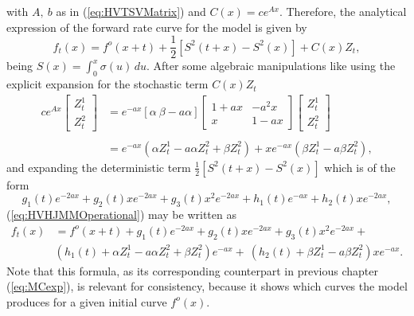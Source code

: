 with $A,~b$ as in (\ref{eq:HVTSVMatrix}) and $C(x)=c e^{A x}$. %
Therefore, the analytical expression of the forward rate curve for the model is
given by \begin{equation}
\label{eq:HVHJMMOperational}
f_t(x)=f^o(x+t)+\frac{1}{2}\left[S^2(t+x)-S^2(x)\right]+C(x)Z_t,
\end{equation}
being $S(x)=\int_0^x \sigma(u)\, du$. After some algebraic
manipulations like using the explicit expansion for the stochastic term 
$C(x) Z_t$  
\begin{equation}
\begin{split}
c e^{A x}\left[\begin{array}{c}
Z^1_t\\
Z^2_t
\end{array}\right] & = e^{-a x}\left[\alpha~\beta-a\alpha\right]
\left[\begin{array}{rr}
1+a x & -a^2 x \\
x & 1-a x
\end{array}\right]\left[\begin{array}{c}
Z^1_t\\
Z^2_t
\end{array}\right] \\ \nonumber
& \\
& = e^{-a x} \left(\alpha  Z^1_t-a \alpha 
   Z^2_t+\beta  Z^2_t\right)+x e^{-a x}
   \left(\beta  Z^1_t-a \beta 
   Z^2_t\right),
\end{split}
\end{equation}
and expanding the deterministic term
$\frac{1}{2}\left[S^2(t+x)-S^2(x)\right]$ which is of the form 
$$
g_1(t) e^{-2 a x}+g_2(t)x e^{-2 a x}+g_3(t) x^2 e^{-2 a x}+h_1(t) e^{-a x}+h_2(t) x e^{- 2 a x},
$$  
(\ref{eq:HVHJMMOperational}) may be written as
\begin{equation}
\label{eq:HVMCexp}
\begin{split}
f_t(x) & =f^o(x+t)+ g_1(t) e^{-2 a x}+g_2(t)x e^{-2 a x}+g_3(t) x^2 e^{-2 a x}+  \\ 
&  \left(h_1(t)+\alpha  Z^1_t-a \alpha Z^2_t+\beta Z^2_t\right)e^{-a x}
+ \ \left(h_2(t)+\beta Z^1_t-a \beta Z^2_t\right) x e^{-a x}.
\end{split}
\end{equation}
Note that this formula, as its corresponding counterpart in previous
chapter (\ref{eq:MCexp}), is relevant for consistency, because it
shows which curves the model produces for a given initial curve
$f^o(x)$.
